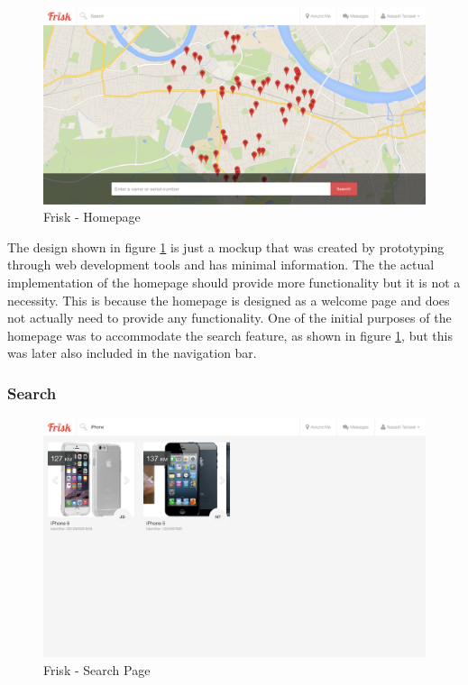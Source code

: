 \begin{figure}[H]
	\centering
	\includegraphics[width=1.0\textwidth]{images/Frisk/Page_Home}
	\caption{Frisk - Homepage} \label{fig:Page_Home}
\end{figure}

The design shown in figure \ref{fig:Page_Home} is just a mockup that was created by prototyping through web development tools and has minimal information. The the actual implementation of the homepage should provide more functionality but it is not a necessity. This is because the homepage is designed as a welcome page and does not actually need to provide any functionality. One of the initial purposes of the homepage was to accommodate the search feature, as shown in figure \ref{fig:Page_Home}, but this was later also included in the navigation bar.

\subsubsection{Search}

\begin{figure}[H]
	\centering
	\includegraphics[width=1.0\textwidth]{images/Frisk/Page_Search}
	\caption{Frisk - Search Page} \label{fig:Page_Search}
\end{figure}

